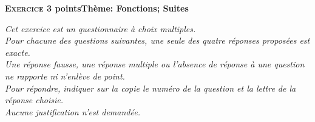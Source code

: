 \documentclass[10pt,a4paper]{article}
\begin{document}
\bigskip

\textbf{\textsc{Exercice 3}  points\hfill Thème: Fonctions; Suites}

\medskip

\emph{Cet exercice est un questionnaire à choix multiples.\\
Pour chacune des questions suivantes, une seule des quatre réponses proposées est exacte.\\
Une réponse fausse, une réponse multiple ou l'absence de réponse à une question ne rapporte ni n'enlève de point.\\
Pour répondre, indiquer sur la copie le numéro de la question et la lettre de la réponse choisie.\\Aucune justification n'est demandée.}

\medskip
\end{document}
